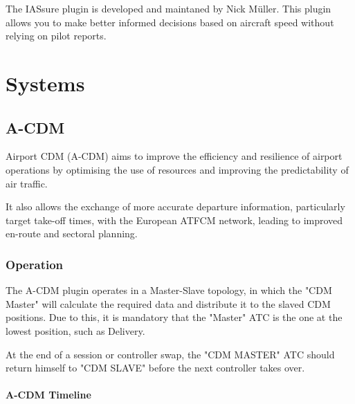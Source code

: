 \documentclass[a4paper,oneside,11pt]{memoir}
\begin{document}
\bigskip

The IASsure plugin is developed and maintaned by Nick Müller. This plugin allows you to make better informed decisions based on aircraft speed without relying on pilot reports.\cite{iassure}

\chapter{Systems}

\section{A-CDM}

Airport CDM (A-CDM) aims to improve the efficiency and resilience of airport operations by optimising the use of resources and improving the predictability of air traffic. 

It also allows the exchange of more accurate departure information, particularly target take-off times, with the European ATFCM network, leading to improved en-route and sectoral planning.\cite{eurocontrol}

\subsection{Operation}

The A-CDM plugin operates in a Master-Slave topology, in which the "CDM Master" will calculate the required data and distribute it to the slaved CDM positions. Due to this, it is mandatory that the "Master" ATC is the one at the lowest position, such as Delivery.

  



At the end of a session or controller swap, the "CDM MASTER" ATC should return himself to "CDM SLAVE" before the next controller takes over.

\subsubsection{A-CDM Timeline}
\end{document}
